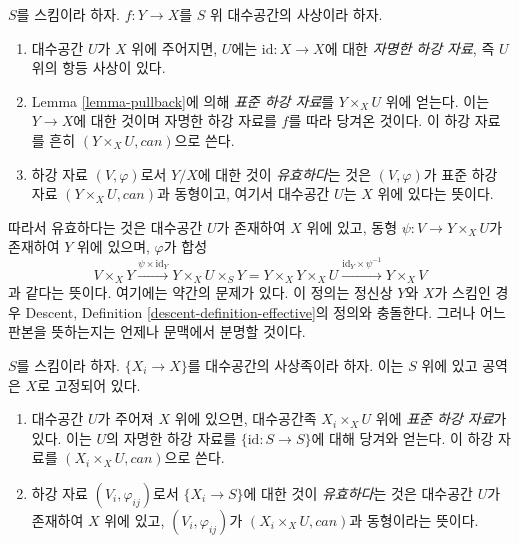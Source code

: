 \begin{definition}
\label{definition-effective}
$S$를 스킴이라 하자. $f:Y\to X$를 $S$ 위 대수공간의 사상이라 하자.
\begin{enumerate}
\item 대수공간 $U$가 $X$ 위에 주어지면, $U$에는
$\text{id}:X\to X$에 대한 {\it 자명한 하강 자료}, 즉 $U$ 위의 항등
사상이 있다.
\item Lemma \ref{lemma-pullback}에 의해 {\it 표준 하강 자료}를
$Y\times_XU$ 위에 얻는다. 이는 $Y\to X$에 대한 것이며 자명한 하강
자료를 $f$를 따라 당겨온 것이다.
이 하강 자료를 흔히 $(Y\times_XU,can)$으로 쓴다.
\item 하강 자료 $(V,\varphi)$로서 $Y/X$에 대한 것이 {\it 유효하다}는
것은 $(V,\varphi)$가 표준 하강 자료 $(Y\times_XU,can)$과 동형이고,
여기서 대수공간 $U$는 $X$ 위에 있다는 뜻이다.
\end{enumerate}
\end{definition}

\noindent
따라서 유효하다는 것은 대수공간 $U$가 존재하여 $X$ 위에 있고, 동형
$\psi:V\to Y\times_XU$가 존재하여 $Y$ 위에 있으며, $\varphi$가 합성
$$
V \times_X Y \xrightarrow{\psi \times \text{id}_Y}
Y \times_X U \times_S Y =
Y \times_X Y \times_X U
\xrightarrow{\text{id}_Y \times \psi^{-1}}
Y \times_X V
$$
과 같다는 뜻이다. 여기에는 약간의 문제가 있다. 이 정의는 정신상 $Y$와
$X$가 스킴인 경우 Descent, Definition
\ref{descent-definition-effective}의 정의와 충돌한다. 그러나 어느 판본을
뜻하는지는 언제나 문맥에서 분명할 것이다.

\begin{definition}
\label{definition-effective-family}
$S$를 스킴이라 하자. $\{X_i\to X\}$를 대수공간의 사상족이라 하자. 이는
$S$ 위에 있고 공역은 $X$로 고정되어 있다.
\begin{enumerate}
\item 대수공간 $U$가 주어져 $X$ 위에 있으면, 대수공간족
$X_i\times_XU$ 위에 {\it 표준 하강 자료}가 있다. 이는 $U$의 자명한
하강 자료를
$\{\text{id}:S\to S\}$에 대해 당겨와 얻는다. 이 하강 자료를
$(X_i\times_XU,can)$으로 쓴다.
\item 하강 자료 $(V_i,\varphi_{ij})$로서
$\{X_i\to S\}$에 대한 것이 {\it 유효하다}는 것은 대수공간 $U$가
존재하여 $X$ 위에 있고, $(V_i,\varphi_{ij})$가 $(X_i\times_XU,can)$과
동형이라는 뜻이다.
\end{enumerate}
\end{definition}






